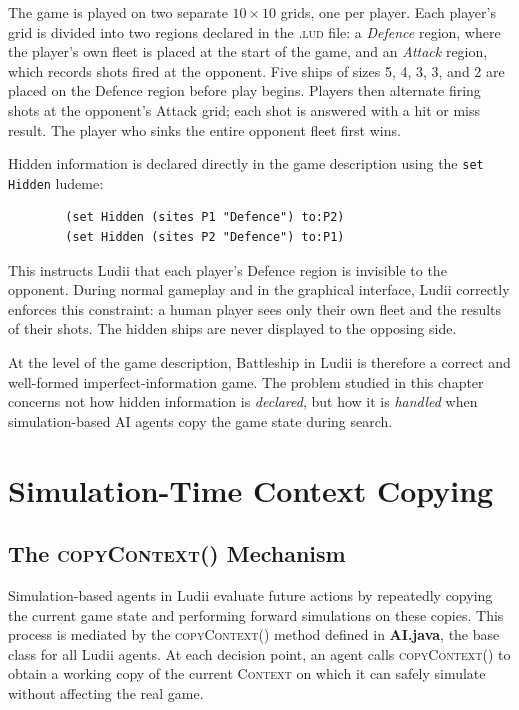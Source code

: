 The game is played on two separate $10 \times 10$ grids, one per player. Each player's grid is divided into two regions declared in the \textsc{.lud} file: a \textit{Defence} region, where the player's own fleet is placed at the start of the game, and an \textit{Attack} region, which records shots fired at the opponent. Five ships of sizes 5, 4, 3, 3, and 2 are placed on the Defence region before play begins. Players then alternate firing shots at the opponent's Attack grid; each shot is answered with a hit or miss result. The player who sinks the entire opponent fleet first wins.

Hidden information is declared directly in the game description using the \texttt{set Hidden} ludeme:

\begin{center}
    \begin{verbatim}
        (set Hidden (sites P1 "Defence") to:P2)
        (set Hidden (sites P2 "Defence") to:P1)
    \end{verbatim}
\end{center}

This instructs Ludii that each player's Defence region is invisible to the opponent. During normal gameplay and in the graphical interface, Ludii correctly enforces this constraint: a human player sees only their own fleet and the results of their shots. The hidden ships are never displayed to the opposing side.

At the level of the game description, Battleship in Ludii is therefore a correct and well-formed imperfect-information game. The problem studied in this chapter concerns not how hidden information is \emph{declared}, but how it is \emph{handled} when simulation-based AI agents copy the game state during search.

\section{Simulation-Time Context Copying}
\label{sec:copycontext}

\subsection{The \textsc{copyContext()} Mechanism}

Simulation-based agents in Ludii evaluate future actions by repeatedly copying the current game state and performing forward simulations on these copies. This process is mediated by the \textsc{copyContext()} method defined in \textbf{AI.java}, the base class for all Ludii agents. At each decision point, an agent calls \textsc{copyContext()} to obtain a working copy of the current \textsc{Context} on which it can safely simulate without affecting the real game.

